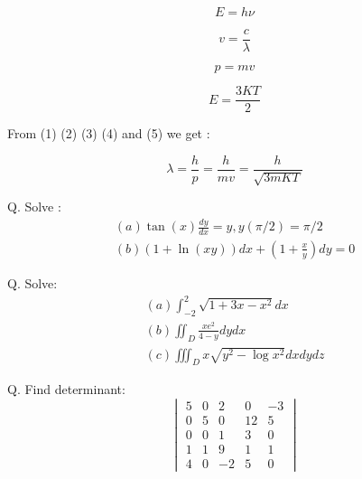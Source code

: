 \documentclass{article}
\begin{document}
\begin{equation}
	E=h\nu
\end{equation}

\begin{equation}
	v=\frac{c}{\lambda}
\end{equation}

\begin{equation}
	p=mv
\end{equation}

\begin{equation}
	E = \frac{3KT}{2}
\end{equation}

From (1) (2) (3) (4) and (5) we get :

\begin{equation*}
	\lambda = \frac{h}{p} = \frac{h}{mv} = \frac{h}{\sqrt{3mKT}}
\end{equation*}

Q. Solve :
\begin{align}
	(a) \tan(x) \frac{dy}{dx} = y , y(\pi / 2) = \pi/2\\
	(b) (1+\ln(xy))dx + (1+\frac{x}{y})dy=0
\end{align}

Q. Solve:
\begin{align*}
	(a) \int_{-2}^{2} \sqrt{1+3x-x^2} dx\\
	(b) \iint_{D} \frac{xe^2}{4-y} dy dx\\
	(c) \iiint_{D} x \sqrt{y^2 - \log{x^2}} dx dy dz
\end{align*}

Q. Find determinant:
\[
\begin{vmatrix}5 & 0 & 2 & 0 & -3 \\
	0 & 5 & 0 & 12 & 5 \\
	0 & 0 & 1 & 3 & 0 \\
	1 & 1 & 9 & 1 & 1 \\
	4 & 0 & -2 & 5 & 0 
\end{vmatrix}
\]
\end{document}
